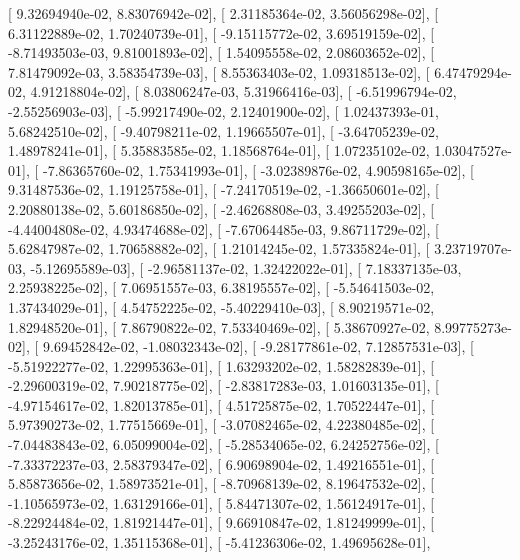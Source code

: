 \documentclass{article}
\begin{document}
       [  9.32694940e-02,   8.83076942e-02],
       [  2.31185364e-02,   3.56056298e-02],
       [  6.31122889e-02,   1.70240739e-01],
       [ -9.15115772e-02,   3.69519159e-02],
       [ -8.71493503e-03,   9.81001893e-02],
       [  1.54095558e-02,   2.08603652e-02],
       [  7.81479092e-03,   3.58354739e-03],
       [  8.55363403e-02,   1.09318513e-02],
       [  6.47479294e-02,   4.91218804e-02],
       [  8.03806247e-03,   5.31966416e-03],
       [ -6.51996794e-02,  -2.55256903e-03],
       [ -5.99217490e-02,   2.12401900e-02],
       [  1.02437393e-01,   5.68242510e-02],
       [ -9.40798211e-02,   1.19665507e-01],
       [ -3.64705239e-02,   1.48978241e-01],
       [  5.35883585e-02,   1.18568764e-01],
       [  1.07235102e-02,   1.03047527e-01],
       [ -7.86365760e-02,   1.75341993e-01],
       [ -3.02389876e-02,   4.90598165e-02],
       [  9.31487536e-02,   1.19125758e-01],
       [ -7.24170519e-02,  -1.36650601e-02],
       [  2.20880138e-02,   5.60186850e-02],
       [ -2.46268808e-03,   3.49255203e-02],
       [ -4.44004808e-02,   4.93474688e-02],
       [ -7.67064485e-03,   9.86711729e-02],
       [  5.62847987e-02,   1.70658882e-02],
       [  1.21014245e-02,   1.57335824e-01],
       [  3.23719707e-03,  -5.12695589e-03],
       [ -2.96581137e-02,   1.32422022e-01],
       [  7.18337135e-03,   2.25938225e-02],
       [  7.06951557e-03,   6.38195557e-02],
       [ -5.54641503e-02,   1.37434029e-01],
       [  4.54752225e-02,  -5.40229410e-03],
       [  8.90219571e-02,   1.82948520e-01],
       [  7.86790822e-02,   7.53340469e-02],
       [  5.38670927e-02,   8.99775273e-02],
       [  9.69452842e-02,  -1.08032343e-02],
       [ -9.28177861e-02,   7.12857531e-03],
       [ -5.51922277e-02,   1.22995363e-01],
       [  1.63293202e-02,   1.58282839e-01],
       [ -2.29600319e-02,   7.90218775e-02],
       [ -2.83817283e-03,   1.01603135e-01],
       [ -4.97154617e-02,   1.82013785e-01],
       [  4.51725875e-02,   1.70522447e-01],
       [  5.97390273e-02,   1.77515669e-01],
       [ -3.07082465e-02,   4.22380485e-02],
       [ -7.04483843e-02,   6.05099004e-02],
       [ -5.28534065e-02,   6.24252756e-02],
       [ -7.33372237e-03,   2.58379347e-02],
       [  6.90698904e-02,   1.49216551e-01],
       [  5.85873656e-02,   1.58973521e-01],
       [ -8.70968139e-02,   8.19647532e-02],
       [ -1.10565973e-02,   1.63129166e-01],
       [  5.84471307e-02,   1.56124917e-01],
       [ -8.22924484e-02,   1.81921447e-01],
       [  9.66910847e-02,   1.81249999e-01],
       [ -3.25243176e-02,   1.35115368e-01],
       [ -5.41236306e-02,   1.49695628e-01],
\end{document}
